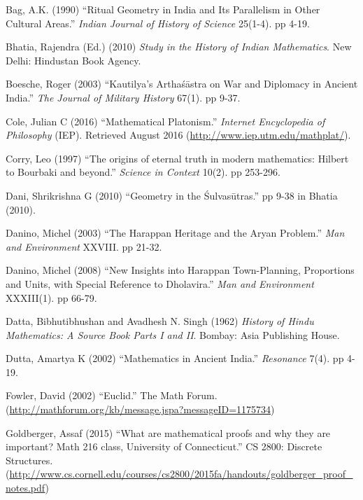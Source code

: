 \newpage

\begin{thebibliography}{99}
\itemsep=2pt
Bag, A.K. (1990) ``Ritual Geometry in India and Its Parallelism in Other Cultural Areas.'' {\sl Indian Journal of History of Science} 25(1-4). pp 4-19.

Bhatia, Rajendra (Ed.) (2010) {\sl Study in the History of Indian Mathematics}. New Delhi: Hindustan Book Agency.

Boesche, Roger (2003) ``Kautilya's Arthaśāstra on War and Diplomacy in Ancient India.'' {\sl The Journal of Military History} 67(1). pp 9-37.

Cole, Julian C (2016) ``Mathematical Platonism.'' {\sl Internet Encyclopedia of Philosophy} (IEP). Retrieved August 2016 (\url{http://www.iep.utm.edu/mathplat/}).

Corry, Leo (1997) ``The origins of eternal truth in modern mathematics: Hilbert to Bourbaki and beyond.'' {\sl Science in Context} 10(2). pp 253-296.

Dani, Shrikrishna G (2010) ``Geometry in the Śulvasūtras.'' pp 9-38 in Bhatia (2010).

Danino, Michel (2003) ``The Harappan Heritage and the Aryan Problem.'' {\sl Man and Environment} XXVIII. pp 21-32.

Danino, Michel (2008) ``New Insights into Harappan Town-Planning, Proportions and Units, with Special Reference to Dholavira.'' {\sl Man and Environment} XXXIII(1). pp 66-79.

Datta, Bibhutibhushan and Avadhesh N. Singh (1962) {\sl History of Hindu Mathematics: A Source Book Parts I and II}. Bombay: Asia Publishing House.

Dutta, Amartya K (2002) ``Mathematics in Ancient India.'' {\sl Resonance} 7(4). pp 4-19.

Fowler, David (2002) ``Euclid.'' The Math Forum. (\url{http://mathforum.org/kb/message.jspa?messageID=1175734})

Goldberger, Assaf (2015) ``What are mathematical proofs and why they are important? Math 216 class, University of Connecticut.'' CS 2800: Discrete Structures. (\url{http://www.cs.cornell.edu/courses/cs2800/2015fa/handouts/goldberger_proof_notes.pdf})


\end{thebibliography}
